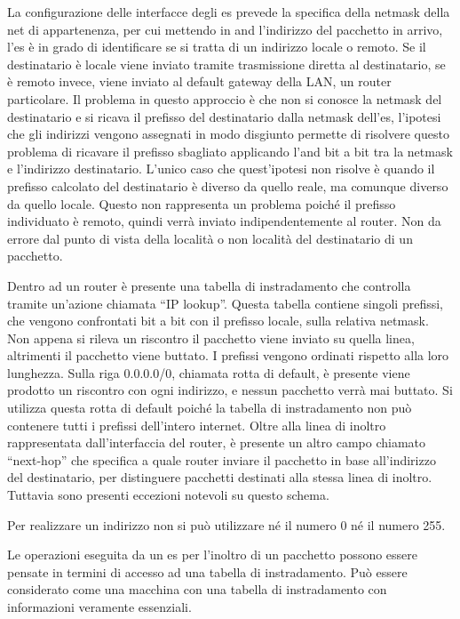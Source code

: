 \documentclass{article}
\numberwithin{equation}{subsection}
\begin{document}
La configurazione delle interfacce degli es prevede la specifica della netmask della net di appartenenza, per cui mettendo in and l'indirizzo del pacchetto in arrivo, 
l'es è in grado di identificare se si tratta di un indirizzo locale o remoto. Se il destinatario è locale viene inviato tramite trasmissione diretta al destinatario, 
se è remoto invece, viene inviato al default gateway della LAN, un router particolare. 
Il problema in questo approccio è che non si conosce la netmask del destinatario e si ricava il prefisso del destinatario dalla netmask dell'es, l'ipotesi che gli 
indirizzi vengono assegnati in modo disgiunto permette di risolvere questo problema di ricavare il prefisso sbagliato applicando l'and bit a bit tra la netmask e 
l'indirizzo destinatario. L'unico caso che quest'ipotesi non risolve è quando il prefisso calcolato del destinatario è diverso da quello reale, ma comunque diverso 
da quello locale. Questo non rappresenta un problema poiché il prefisso individuato è remoto, quindi verrà inviato indipendentemente al router. 
Non da errore dal punto di vista della località o non località del destinatario di un pacchetto. 

Dentro ad un router è presente una tabella di instradamento che controlla tramite un'azione chiamata ``IP lookup''. Questa tabella contiene singoli prefissi, che 
vengono confrontati bit a bit con il prefisso locale, sulla relativa netmask. Non appena si rileva un riscontro il pacchetto viene inviato su quella linea, 
altrimenti il pacchetto viene buttato. I prefissi vengono ordinati rispetto alla loro lunghezza. Sulla riga 0.0.0.0/0, chiamata rotta di default,  è presente 
viene prodotto un riscontro con ogni indirizzo, e nessun pacchetto verrà mai buttato. 
Si utilizza questa rotta di default poiché la tabella di instradamento non può contenere tutti i prefissi dell'intero internet. 
Oltre alla linea di inoltro rappresentata dall'interfaccia del router, è presente un altro campo chiamato ``next-hop'' che specifica a quale router inviare il pacchetto 
in base all'indirizzo del destinatario, per distinguere pacchetti destinati alla stessa linea di inoltro. Tuttavia sono presenti eccezioni notevoli su questo schema. 

Per realizzare un indirizzo non si può utilizzare né il numero 0 né il numero 255. 

Le operazioni eseguita da un es per l'inoltro di un pacchetto possono essere pensate in termini di accesso ad una tabella di instradamento. Può 
essere considerato come una macchina con una tabella di instradamento con informazioni veramente essenziali. 
\end{document}
